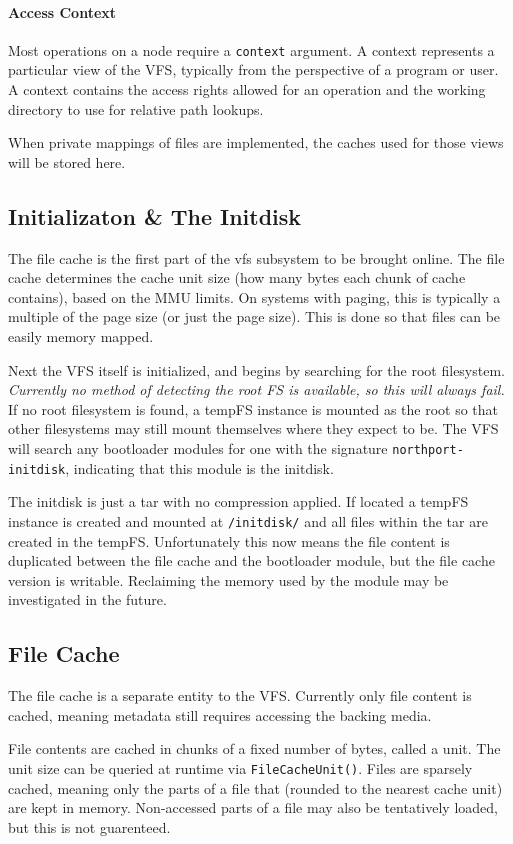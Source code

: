 \paragraph{Access Context}
Most operations on a node require a \verb|context| argument. A context represents a particular view of the VFS, typically from the perspective of a program or user. A context contains the access rights allowed for an operation and the working directory to use for relative path lookups.

When private mappings of files are implemented, the caches used for those views will be stored here.

\subsection{Initializaton \& The Initdisk}
The file cache is the first part of the vfs subsystem to be brought online. The file cache determines the cache unit size (how many bytes each chunk of cache contains), based on the MMU limits. On systems with paging, this is typically a multiple of the page size (or just the page size). This is done so that files can be easily memory mapped.

Next the VFS itself is initialized, and begins by searching for the root filesystem. \textit{Currently no method of detecting the root FS is available, so this will always fail.} If no root filesystem is found, a tempFS instance is mounted as the root so that other filesystems may still mount themselves where they expect to be. The VFS will search any bootloader modules for one with the signature \verb|northport-initdisk|, indicating that this module is the initdisk.

The initdisk is just a tar with no compression applied. If located a tempFS instance is created and mounted at \verb|/initdisk/| and all files within the tar are created in the tempFS. Unfortunately this now means the file content is duplicated between the file cache and the bootloader module, but the file cache version is writable. Reclaiming the memory used by the module may be investigated in the future.

\subsection{File Cache}
The file cache is a separate entity to the VFS. Currently only file content is cached, meaning metadata still requires accessing the backing media.

File contents are cached in chunks of a fixed number of bytes, called a unit. The unit size can be queried at runtime via \verb|FileCacheUnit()|. Files are sparsely cached, meaning only the parts of a file that (rounded to the nearest cache unit) are kept in memory. Non-accessed parts of a file may also be tentatively loaded, but this is not guarenteed.

